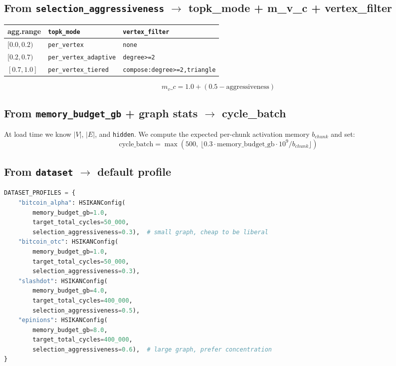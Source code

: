 \documentclass[11pt,a4paper]{article}
\begin{document}
\subsection*{From \texttt{selection\_aggressiveness} $\rightarrow$ topk\_mode + m\_v\_c + vertex\_filter}
\begin{center}
\begin{tabular}{lll}
\toprule
agg.range & \texttt{topk\_mode} & \texttt{vertex\_filter} \\
\midrule
$[0.0, 0.2)$ & \texttt{per\_vertex}          & \texttt{none} \\
$[0.2, 0.7)$ & \texttt{per\_vertex\_adaptive} & \texttt{degree>=2} \\
$[0.7, 1.0]$ & \texttt{per\_vertex\_tiered}   & \texttt{compose:degree>=2,triangle} \\
\bottomrule
\end{tabular}
\end{center}

\[ m_v\_c = 1.0 + (0.5 - \text{aggressiveness}) \]

\subsection*{From \texttt{memory\_budget\_gb} + graph stats $\rightarrow$ cycle\_batch}
At load time we know $|V|$, $|E|$, and \texttt{hidden}.  We compute
the expected per-chunk activation memory $b_{chunk}$ and set:
\[ \text{cycle\_batch} = \max\!\left(500,\ \lfloor 0.3 \cdot \text{memory\_budget\_gb} \cdot 10^9 / b_{chunk} \rfloor\right) \]

\subsection*{From \texttt{dataset} $\rightarrow$ default profile}
\begin{lstlisting}[language=python]
DATASET_PROFILES = {
    "bitcoin_alpha": HSIKANConfig(
        memory_budget_gb=1.0,
        target_total_cycles=50_000,
        selection_aggressiveness=0.3),  # small graph, cheap to be liberal
    "bitcoin_otc": HSIKANConfig(
        memory_budget_gb=1.0,
        target_total_cycles=50_000,
        selection_aggressiveness=0.3),
    "slashdot": HSIKANConfig(
        memory_budget_gb=4.0,
        target_total_cycles=400_000,
        selection_aggressiveness=0.5),
    "epinions": HSIKANConfig(
        memory_budget_gb=8.0,
        target_total_cycles=400_000,
        selection_aggressiveness=0.6),  # large graph, prefer concentration
}
\end{lstlisting}
\end{document}
